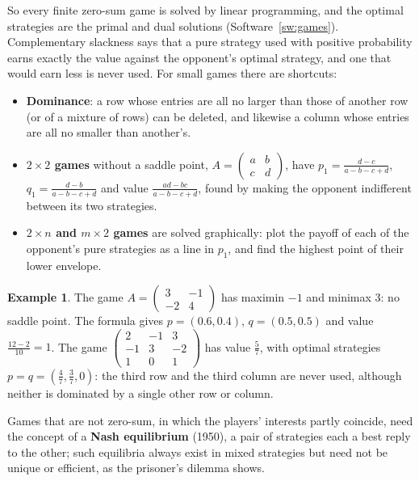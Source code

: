 \documentclass[11pt,a4paper]{article}
\numberwithin{equation}{section}
\theoremstyle{definition}
\newtheorem{exa}[thm]{Example}
\begin{document}
So every finite zero-sum game is solved by linear programming, and the optimal strategies are the primal and dual solutions (Software~\ref{sw:games}). Complementary slackness says that a pure strategy used with positive probability earns exactly the value against the opponent's optimal strategy, and one that would earn less is
never used. For small games there are shortcuts:
\begin{itemize}
\item \textbf{Dominance}: a row whose entries are all no larger than those of another row (or of a mixture of rows) can be deleted, and likewise a column whose entries are all no smaller than another's.
\item \textbf{$2 \times 2$ games} without a saddle point, $A = \begin{pmatrix} a & b \\ c & d \end{pmatrix}$, have $p_1 = \frac{d - c}{a - b - c + d}$, $q_1 = \frac{d - b}{a - b - c + d}$ and value $\frac{ad - bc}{a - b - c + d}$, found by making the opponent indifferent between its two strategies.
\item \textbf{$2 \times n$ and $m \times 2$ games} are solved graphically: plot the payoff of each of the opponent's pure strategies as a line in $p_1$, and find the highest point of their lower envelope.
\end{itemize}

\begin{exa}
\label{ex:game}
The game $A = \begin{pmatrix} 3 & -1 \\ -2 & 4 \end{pmatrix}$ has maximin $-1$ and minimax $3$: no saddle point. The formula gives $p = (0.6, 0.4)$, $q = (0.5, 0.5)$ and value $\frac{12 - 2}{10} = 1$. The game $\begin{pmatrix} 2 & -1 & 3 \\ -1 & 3 & -2 \\ 1 & 0 & 1 \end{pmatrix}$ has value $\frac57$, with optimal strategies
$p = q = (\frac47, \frac37, 0)$: the third row and the third column are never used, although neither is dominated by a single other row or column.
\end{exa}

Games that are not zero-sum, in which the players' interests partly coincide, need the concept of a \textbf{Nash equilibrium} (1950), a pair of strategies each a best reply to the other; such equilibria always exist in mixed strategies but need not be unique or efficient, as the prisoner's dilemma shows.
\end{document}

